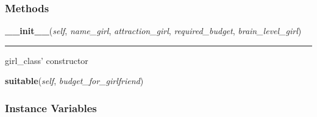 
  \subsubsection{Methods}

    \label{girl_class:girl:__init__}

    \vspace{0.5ex}

\hspace{.8\funcindent}\begin{boxedminipage}{\funcwidth}

    \raggedright \textbf{\_\_init\_\_}(\textit{self}, \textit{name\_girl}, \textit{attraction\_girl}, \textit{required\_budget}, \textit{brain\_level\_girl})

    \vspace{-1.5ex}

    \rule{\textwidth}{0.5\fboxrule}
\setlength{\parskip}{2ex}
    girl\_class' constructor

\setlength{\parskip}{1ex}
    \end{boxedminipage}

    \label{girl_class:girl:suitable}

    \vspace{0.5ex}

\hspace{.8\funcindent}\begin{boxedminipage}{\funcwidth}

    \raggedright \textbf{suitable}(\textit{self}, \textit{budget\_for\_girlfriend})

\setlength{\parskip}{2ex}
\setlength{\parskip}{1ex}
    \end{boxedminipage}



  \subsubsection{Instance Variables}

